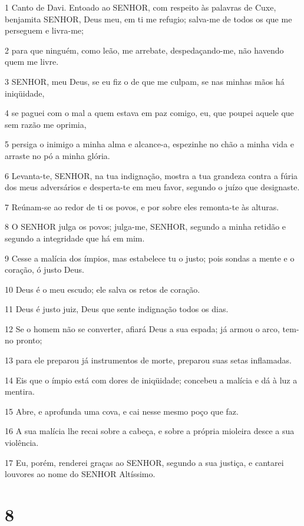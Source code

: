 \par 1 Canto de Davi. Entoado ao SENHOR, com respeito às palavras de Cuxe, benjamita SENHOR, Deus meu, em ti me refugio; salva-me de todos os que me perseguem e livra-me;
\par 2 para que ninguém, como leão, me arrebate, despedaçando-me, não havendo quem me livre.
\par 3 SENHOR, meu Deus, se eu fiz o de que me culpam, se nas minhas mãos há iniqüidade,
\par 4 se paguei com o mal a quem estava em paz comigo, eu, que poupei aquele que sem razão me oprimia,
\par 5 persiga o inimigo a minha alma e alcance-a, espezinhe no chão a minha vida e arraste no pó a minha glória.
\par 6 Levanta-te, SENHOR, na tua indignação, mostra a tua grandeza contra a fúria dos meus adversários e desperta-te em meu favor, segundo o juízo que designaste.
\par 7 Reúnam-se ao redor de ti os povos, e por sobre eles remonta-te às alturas.
\par 8 O SENHOR julga os povos; julga-me, SENHOR, segundo a minha retidão e segundo a integridade que há em mim.
\par 9 Cesse a malícia dos ímpios, mas estabelece tu o justo; pois sondas a mente e o coração, ó justo Deus.
\par 10 Deus é o meu escudo; ele salva os retos de coração.
\par 11 Deus é justo juiz, Deus que sente indignação todos os dias.
\par 12 Se o homem não se converter, afiará Deus a sua espada; já armou o arco, tem-no pronto;
\par 13 para ele preparou já instrumentos de morte, preparou suas setas inflamadas.
\par 14 Eis que o ímpio está com dores de iniqüidade; concebeu a malícia e dá à luz a mentira.
\par 15 Abre, e aprofunda uma cova, e cai nesse mesmo poço que faz.
\par 16 A sua malícia lhe recai sobre a cabeça, e sobre a própria mioleira desce a sua violência.
\par 17 Eu, porém, renderei graças ao SENHOR, segundo a sua justiça, e cantarei louvores ao nome do SENHOR Altíssimo.

\chapter{8}


